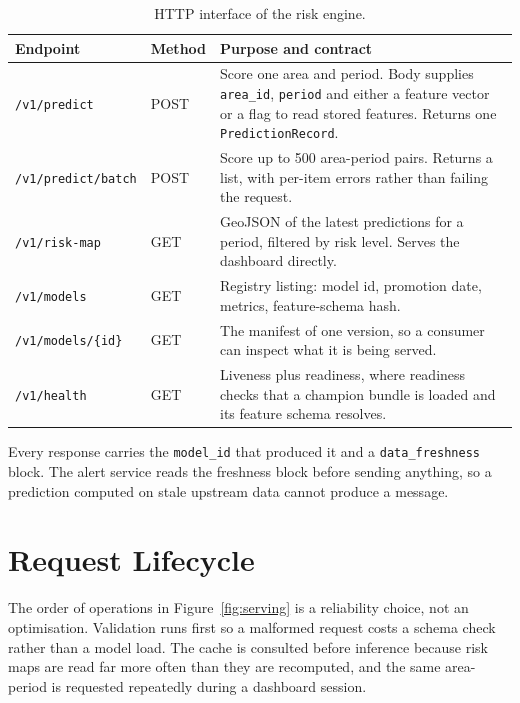 \documentclass[10pt,openany]{report}
\begin{document}
\begin{table}[htbp]
\centering
\caption{HTTP interface of the risk engine.}
\label{tab:api}
\small
\begin{tabular}{@{}>{\raggedright\arraybackslash}p{3.6cm}>{\raggedright\arraybackslash}p{1.5cm}>{\raggedright\arraybackslash}p{9.2cm}@{}}
\toprule
\textbf{Endpoint} & \textbf{Method} & \textbf{Purpose and contract} \\
\midrule
\texttt{/v1/predict} & POST & Score one area and period. Body supplies \texttt{area\_id}, \texttt{period} and either a feature vector or a flag to read stored features. Returns one \texttt{PredictionRecord}. \\
\texttt{/v1/predict/batch} & POST & Score up to 500 area-period pairs. Returns a list, with per-item errors rather than failing the request. \\
\texttt{/v1/risk-map} & GET & GeoJSON of the latest predictions for a period, filtered by risk level. Serves the dashboard directly. \\
\texttt{/v1/models} & GET & Registry listing: model id, promotion date, metrics, feature-schema hash. \\
\texttt{/v1/models/\{id\}} & GET & The manifest of one version, so a consumer can inspect what it is being served. \\
\texttt{/v1/health} & GET & Liveness plus readiness, where readiness checks that a champion bundle is loaded and its feature schema resolves. \\
\bottomrule
\end{tabular}
\end{table}

Every response carries the \texttt{model\_id} that produced it and a \texttt{data\_freshness} block.
The alert service reads the freshness block before sending anything, so a prediction computed on
stale upstream data cannot produce a message.



\section{Request Lifecycle}

The order of operations in Figure~\ref{fig:serving} is a reliability choice, not an optimisation.
Validation runs first so a malformed request costs a schema check rather than a model load. The
cache is consulted before inference because risk maps are read far more often than they are
recomputed, and the same area-period is requested repeatedly during a dashboard session.
\end{document}
